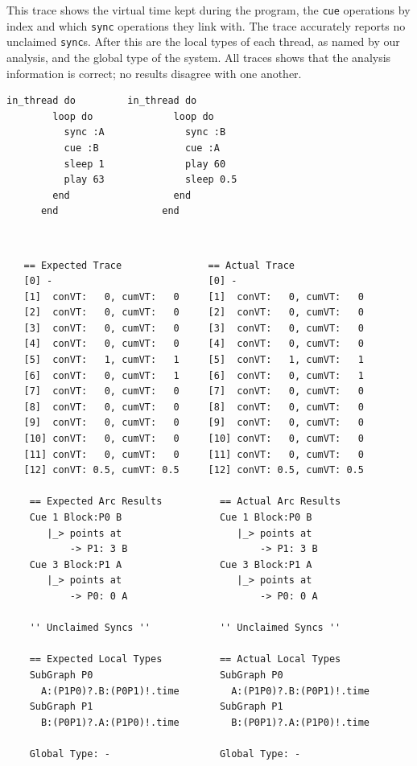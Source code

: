 \documentclass[11pt, abstracton, twoside, titlepage=true]{scrartcl}
\begin{document}
This trace shows the virtual time kept during the program, the \texttt{cue} operations 
by index and which \texttt{sync} operations they link with. The trace accurately 
reports no unclaimed \texttt{sync}s. After this are the local types of each thread, 
as named by our analysis, and the global type of the system. All traces shows that 
the analysis information is correct; no results disagree with one another.

\begin{minipage}{\textwidth}
	\begin{lstlisting}[style = sonicpi]
      in_thread do         in_thread do
        loop do              loop do
          sync :A              sync :B 
          cue :B               cue :A 
          sleep 1              play 60
          play 63              sleep 0.5
        end                  end
      end                  end
	\end{lstlisting}
\end{minipage}
\\
\begin{lstlisting}
   == Expected Trace               == Actual Trace
   [0] -                           [0] -
   [1]  conVT:   0, cumVT:   0     [1]  conVT:   0, cumVT:   0
   [2]  conVT:   0, cumVT:   0     [2]  conVT:   0, cumVT:   0
   [3]  conVT:   0, cumVT:   0     [3]  conVT:   0, cumVT:   0
   [4]  conVT:   0, cumVT:   0     [4]  conVT:   0, cumVT:   0
   [5]  conVT:   1, cumVT:   1     [5]  conVT:   1, cumVT:   1
   [6]  conVT:   0, cumVT:   1     [6]  conVT:   0, cumVT:   1
   [7]  conVT:   0, cumVT:   0     [7]  conVT:   0, cumVT:   0
   [8]  conVT:   0, cumVT:   0     [8]  conVT:   0, cumVT:   0
   [9]  conVT:   0, cumVT:   0     [9]  conVT:   0, cumVT:   0
   [10] conVT:   0, cumVT:   0     [10] conVT:   0, cumVT:   0
   [11] conVT:   0, cumVT:   0     [11] conVT:   0, cumVT:   0
   [12] conVT: 0.5, cumVT: 0.5     [12] conVT: 0.5, cumVT: 0.5

    == Expected Arc Results          == Actual Arc Results 
    Cue 1 Block:P0 B                 Cue 1 Block:P0 B
       |_> points at                    |_> points at 
           -> P1: 3 B                       -> P1: 3 B
    Cue 3 Block:P1 A                 Cue 3 Block:P1 A
       |_> points at                    |_> points at 
           -> P0: 0 A                       -> P0: 0 A

    '' Unclaimed Syncs ''            '' Unclaimed Syncs '' 

    == Expected Local Types          == Actual Local Types
    SubGraph P0                      SubGraph P0
      A:(P1P0)?.B:(P0P1)!.time         A:(P1P0)?.B:(P0P1)!.time
    SubGraph P1                      SubGraph P1
      B:(P0P1)?.A:(P1P0)!.time         B:(P0P1)?.A:(P1P0)!.time

    Global Type: -                   Global Type: -
\end{lstlisting}
\end{document}
